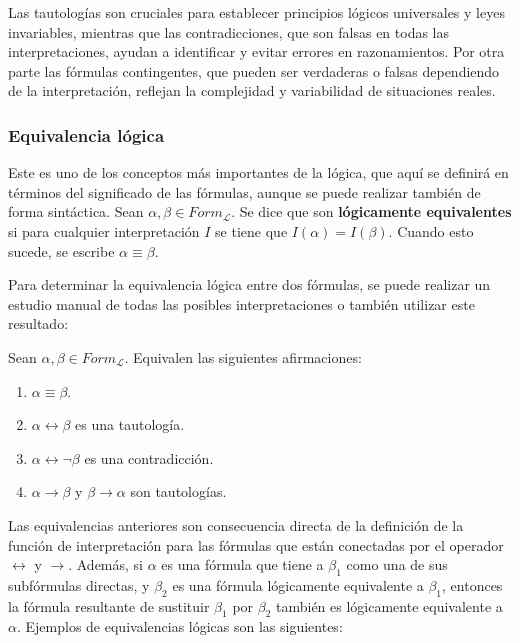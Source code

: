Las tautologías son cruciales para establecer principios lógicos universales y leyes invariables, mientras que las contradicciones, que son falsas en todas las interpretaciones, ayudan a identificar y evitar errores en razonamientos. Por otra parte las fórmulas contingentes, que pueden ser verdaderas o falsas dependiendo de la interpretación, reflejan la complejidad y variabilidad de situaciones reales. 

\subsubsection{Equivalencia lógica}\label{subsubsection:lpropequivalency}
Este es uno de los conceptos más importantes de la lógica, que aquí se definirá en términos del significado de las fórmulas, aunque se puede realizar también de forma sintáctica. Sean $\alpha,\beta \in Form_{\mathcal{L}}$. Se dice que son \textbf{lógicamente equivalentes} si para cualquier interpretación $I$ se tiene que $I(\alpha) = I(\beta)$. Cuando esto sucede, se escribe $\alpha \equiv \beta$.

Para determinar la equivalencia lógica entre dos fórmulas, se puede realizar un estudio manual de todas las posibles interpretaciones o también utilizar este resultado:

\begin{proposicion}
    Sean $\alpha,\beta \in Form_{\mathcal{L}}$. Equivalen las siguientes afirmaciones:
    \begin{enumerate}[label=\roman*.]
        \item $\alpha \equiv \beta$.
        \item $\alpha \leftrightarrow \beta$ es una tautología.
        \item $\alpha \leftrightarrow \neg\beta$ es una contradicción.
        \item $\alpha \rightarrow \beta$ y $\beta \rightarrow \alpha$ son tautologías.
    \end{enumerate}
\end{proposicion}

Las equivalencias anteriores son consecuencia directa de la definición de la función de interpretación para las fórmulas que están conectadas por el operador $\leftrightarrow$ y $\rightarrow$. Además, si $\alpha$ es una fórmula que tiene a $\beta_1$ como una de sus subfórmulas directas, y $\beta_2$ es una fórmula lógicamente equivalente a $\beta_1$, entonces la fórmula resultante de sustituir $\beta_1$ por $\beta_2$ también es lógicamente equivalente a $\alpha$. Ejemplos de equivalencias lógicas son las siguientes:

